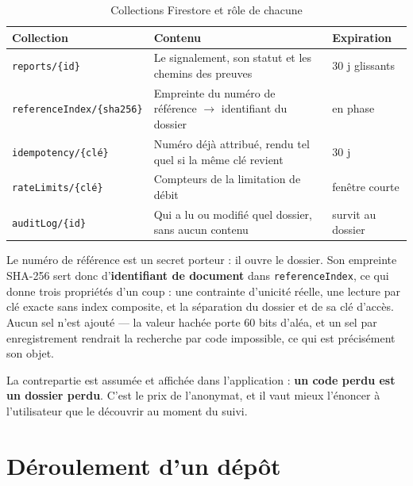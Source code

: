 \documentclass[11pt,a4paper,oneside,openany]{report}
\begin{document}
\begin{table}[htbp]
\centering
\small
\caption{Collections Firestore et rôle de chacune}
\label{tab:collections}
\begin{tabularx}{\textwidth}{@{}L{3.35cm} X L{2.15cm}@{}}
\toprule
\textbf{Collection} & \textbf{Contenu} & \textbf{Expiration} \\
\midrule
\texttt{reports/\{id\}} & Le signalement, son statut et les chemins des preuves &
30 j glissants \\
\texttt{referenceIndex/}\linebreak\texttt{\{sha256\}} & Empreinte du numéro de référence
$\rightarrow$ identifiant du dossier & en phase \\
\texttt{idempotency/\{clé\}} & Numéro déjà attribué, rendu tel quel si la même
clé revient & 30 j \\
\texttt{rateLimits/\{clé\}} & Compteurs de la limitation de débit & fenêtre
courte \\
\texttt{auditLog/\{id\}} & Qui a lu ou modifié quel dossier, sans aucun
contenu & survit au dossier \\
\bottomrule
\end{tabularx}
\end{table}

\begin{decision}
\small
Le numéro de référence est un secret porteur : il ouvre le dossier. Son
empreinte SHA-256 sert donc d'\textbf{identifiant de document} dans
\texttt{referenceIndex}, ce qui donne trois propriétés d'un coup : une contrainte
d'unicité réelle, une lecture par clé exacte sans index composite, et la
séparation du dossier et de sa clé d'accès. Aucun sel n'est ajouté — la valeur
hachée porte 60 bits d'aléa, et un sel par enregistrement rendrait la recherche
par code impossible, ce qui est précisément son objet.
\end{decision}

\begin{vigilance}
\small
La contrepartie est assumée et affichée dans l'application : \textbf{un code
perdu est un dossier perdu}. C'est le prix de l'anonymat, et il vaut mieux
l'énoncer à l'utilisateur que le découvrir au moment du suivi.
\end{vigilance}

\section{Déroulement d'un dépôt}
\end{document}
